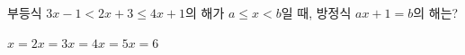 부등식 $3x-1<2x+3\le 4x+1$의 해가 $a\le x<b$일 때, 방정식 $ax+1=b$의 해는?
\begin{choices32}{$x=2$}{$x=3$}{$x=4$}{$x=5$}{$x=6$}\end{choices32}
